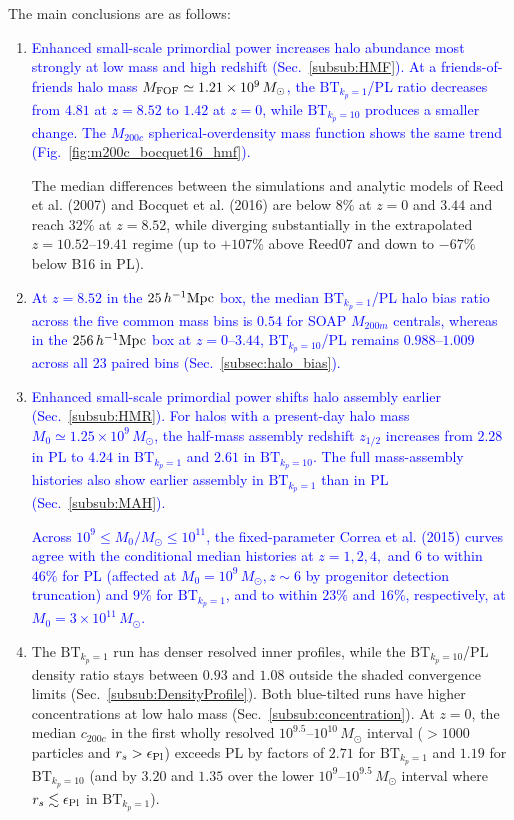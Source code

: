 \documentclass[
 reprint,
 superscriptaddress,
 nofootinbib,
 nobibnotes,
 amsmath,
 amssymb,
 aps,
 prd,
 floatfix,
 longbibliography
]{revtex4-2}
\DeclareRobustCommand{\change}[1]{\textcolor{blue}{#1}}
\DeclareRobustCommand{\BTKPone}{\ensuremath{\mathrm{BT}_{k_p=1}}}
\DeclareRobustCommand{\BTKPten}{\ensuremath{\mathrm{BT}_{k_p=10}}}
\begin{document}
The main conclusions are as follows:
\begin{enumerate}
    \item \change{Enhanced small-scale primordial power increases halo abundance most strongly at low mass and high redshift (Sec.~\ref{subsub:HMF}). At a friends-of-friends halo mass \(M_{\rm FOF}\simeq1.21\times10^9\,M_\odot\), the \BTKPone{}/PL ratio decreases from \(4.81\) at \(z=8.52\) to \(1.42\) at \(z=0\), while \BTKPten{} produces a smaller change. The \(M_{200c}\) spherical-overdensity mass function shows the same trend (Fig.~\ref{fig:m200c_bocquet16_hmf}).}

    The median differences between the simulations and analytic models of Reed et al. (2007) \citep{Reed_2007} and Bocquet et al. (2016) \citep{Bocquet2016} are below \(8\%\) at \(z=0\) and \(3.44\) and reach \(32\%\) at \(z=8.52\), while diverging substantially in the extrapolated \(z=10.52\)--\(19.41\) regime (up to \(+107\%\) above Reed07 and down to \(-67\%\) below B16 in PL).

    \item \change{At \(z=8.52\) in the \(25\,h^{-1}{\rm Mpc}\) box, the median \BTKPone{}/PL halo bias ratio across the five common mass bins is \(0.54\) for SOAP \(M_{200m}\) centrals, whereas in the \(256\,h^{-1}{\rm Mpc}\) box at \(z=0\)--\(3.44\), \BTKPten{}/PL remains \(0.988\)--\(1.009\) across all 23 paired bins (Sec.~\ref{subsec:halo_bias}).}

    \item \change{Enhanced small-scale primordial power shifts halo assembly earlier (Sec.~\ref{subsub:HMR}). For halos with a present-day halo mass \(M_0\simeq1.25\times10^9\,M_\odot\), the half-mass assembly redshift \(z_{1/2}\) increases from \(2.28\) in PL to \(4.24\) in \BTKPone{} and \(2.61\) in \BTKPten{}. The full mass-assembly histories also show earlier assembly in \BTKPone{} than in PL (Sec.~\ref{subsub:MAH}).}

    \change{Across \(10^9\le M_0/M_\odot\le10^{11}\), the fixed-parameter Correa et al. (2015) curves \citep{Correa2015MAHI} agree with the conditional median histories at \(z=1,2,4,\) and \(6\) to within \(46\%\) for PL (affected at \(M_0=10^9\,M_\odot, z\sim6\) by progenitor detection truncation) and \(9\%\) for \BTKPone{}, and to within \(23\%\) and \(16\%\), respectively, at \(M_0=3\times10^{11}\,M_\odot\).}

    \item The \BTKPone{} run has denser resolved inner profiles, while the \BTKPten{}/PL density ratio stays between \(0.93\) and \(1.08\) outside the shaded convergence limits (Sec.~\ref{subsub:DensityProfile}). Both blue-tilted runs have higher concentrations at low halo mass (Sec.~\ref{subsub:concentration}). At \(z=0\), the median \(c_{200c}\) in the first wholly resolved \(10^{9.5}\)--\(10^{10}\,M_\odot\) interval (\(>1000\) particles and \(r_s>\epsilon_{\rm Pl}\)) exceeds PL by factors of \(2.71\) for \BTKPone{} and \(1.19\) for \BTKPten{} (and by \(3.20\) and \(1.35\) over the lower \(10^9\)--\(10^{9.5}\,M_\odot\) interval where \(r_s\lesssim\epsilon_{\rm Pl}\) in \BTKPone{}).



\end{enumerate}
\end{document}
